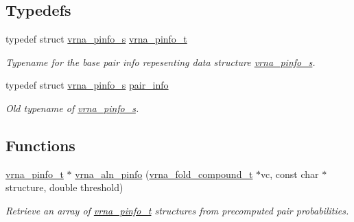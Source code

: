 \subsection*{Typedefs}
\begin{DoxyCompactItemize}
\item 
typedef struct \hyperlink{group__aln__utils_structvrna__pinfo__s}{vrna\+\_\+pinfo\+\_\+s} \hyperlink{group__aln__utils_ga6660dfca23debee7306e0cd53341263f}{vrna\+\_\+pinfo\+\_\+t}\hypertarget{group__aln__utils_ga6660dfca23debee7306e0cd53341263f}{}\label{group__aln__utils_ga6660dfca23debee7306e0cd53341263f}

\begin{DoxyCompactList}\small\item\em Typename for the base pair info repesenting data structure \hyperlink{group__aln__utils_structvrna__pinfo__s}{vrna\+\_\+pinfo\+\_\+s}. \end{DoxyCompactList}\item 
typedef struct \hyperlink{group__aln__utils_structvrna__pinfo__s}{vrna\+\_\+pinfo\+\_\+s} \hyperlink{group__aln__utils_ga7b61662a793ad0aa1ea38efc3a5baacc}{pair\+\_\+info}
\begin{DoxyCompactList}\small\item\em Old typename of \hyperlink{group__aln__utils_structvrna__pinfo__s}{vrna\+\_\+pinfo\+\_\+s}. \end{DoxyCompactList}\end{DoxyCompactItemize}
\subsection*{Functions}
\begin{DoxyCompactItemize}
\item 
\hyperlink{group__aln__utils_ga6660dfca23debee7306e0cd53341263f}{vrna\+\_\+pinfo\+\_\+t} $\ast$ \hyperlink{group__aln__utils_gaf6421a1318586c59fea6a127ed9f65f3}{vrna\+\_\+aln\+\_\+pinfo} (\hyperlink{group__fold__compound_ga1b0cef17fd40466cef5968eaeeff6166}{vrna\+\_\+fold\+\_\+compound\+\_\+t} $\ast$vc, const char $\ast$structure, double threshold)
\begin{DoxyCompactList}\small\item\em Retrieve an array of \hyperlink{group__aln__utils_ga6660dfca23debee7306e0cd53341263f}{vrna\+\_\+pinfo\+\_\+t} structures from precomputed pair probabilities. \end{DoxyCompactList}\end{DoxyCompactItemize}


